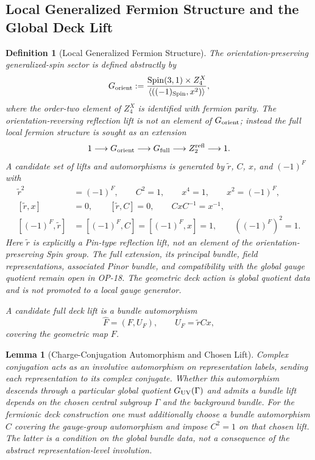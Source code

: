 \documentclass[11pt]{article}
\theoremstyle{canonmath}
\newtheorem{lemma}[theorem]{Lemma}
\newtheorem{definition}[theorem]{Definition}
\theoremstyle{canonpostulate}
\theoremstyle{canonclaim}
\providecommand{\Spin}{\operatorname{Spin}}
\def\mathbb#1{#1}%
\begin{document}
\subsection{Local Generalized Fermion Structure and the Global Deck Lift}

\begin{definition}[Local Generalized Fermion Structure] \label{def:spinZ4}
The orientation-preserving generalized-spin sector is defined abstractly by
\begin{equation}
G_{\rm orient}:=\frac{\Spin(3,1)\times\mathbb Z_4^X}{\langle((-1)_{\Spin},x^2)\rangle},
\end{equation}
where the order-two element of $\mathbb Z_4^X$ is identified with fermion parity. The orientation-reversing reflection lift is not an element of $G_{\rm orient}$; instead the full local fermion structure is sought as an extension
\begin{equation}
1\longrightarrow G_{\rm orient}\longrightarrow G_{\rm full}\longrightarrow\mathbb Z_2^{\rm refl}\longrightarrow1.
\end{equation}
A candidate set of lifts and automorphisms is generated by $\widetilde r$, $C$, $x$, and $(-1)^F$ with
\begin{equation}
\begin{split}
\widetilde r^2&=(-1)^F,\qquad C^2=1,\qquad x^4=1,\qquad x^2=(-1)^F,\\
[\widetilde r,x]&=0,\qquad[\widetilde r,C]=0,\qquad CxC^{-1}=x^{-1},\\
[(-1)^F,\widetilde r]&=[(-1)^F,C]=[(-1)^F,x]=1,\qquad ((-1)^F)^2=1.
\end{split}
\label{eq:htotal}
\end{equation}
Here $\widetilde r$ is explicitly a Pin-type reflection lift, not an element of the orientation-preserving Spin group. The full extension, its principal bundle, field representations, associated Pinor bundle, and compatibility with the global gauge quotient remain open in OP-18. The geometric deck action is global quotient data and is not promoted to a local gauge generator.

A candidate full deck lift is a bundle automorphism
\begin{equation}
\widehat F=(F,U_F),\qquad U_F=\widetilde r Cx,
\end{equation}
covering the geometric map $F$.
\end{definition}

\begin{lemma}[Charge-Conjugation Automorphism and Chosen Lift] \label{lem:C2}
Complex conjugation acts as an involutive automorphism on representation labels, sending each representation to its complex conjugate. Whether this automorphism descends through a particular global quotient $G_{\rm UV}(\Gamma)$ and admits a bundle lift depends on the chosen central subgroup $\Gamma$ and the background bundle. For the fermionic deck construction one must additionally choose a bundle automorphism $C$ covering the gauge-group automorphism and impose $C^2=1$ on that chosen lift. The latter is a condition on the global bundle data, not a consequence of the abstract representation-level involution.
\end{lemma}
\end{document}
